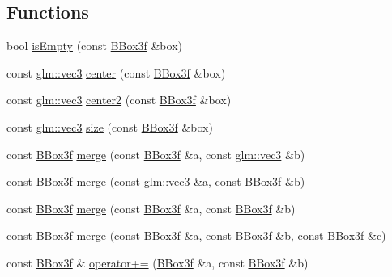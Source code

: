 \subsection*{Functions}
\begin{DoxyCompactItemize}
\item 
bool \hyperlink{namespaceglimac_af7b3a92359ef55ad38fb46b78d8f56f5}{is\+Empty} (const \hyperlink{structglimac_1_1_b_box3f}{B\+Box3f} \&box)
\item 
const \hyperlink{group__core__types_ga1c47e8b3386109bc992b6c48e91b0be7}{glm\+::vec3} \hyperlink{namespaceglimac_ae7ea0ad7ad60966328b8b2a198ad1dc5}{center} (const \hyperlink{structglimac_1_1_b_box3f}{B\+Box3f} \&box)
\item 
const \hyperlink{group__core__types_ga1c47e8b3386109bc992b6c48e91b0be7}{glm\+::vec3} \hyperlink{namespaceglimac_a1286d34984f2db1de4b7a161bcdcc79d}{center2} (const \hyperlink{structglimac_1_1_b_box3f}{B\+Box3f} \&box)
\item 
const \hyperlink{group__core__types_ga1c47e8b3386109bc992b6c48e91b0be7}{glm\+::vec3} \hyperlink{namespaceglimac_a66029611b8aa9645c13bb0d68c8f581e}{size} (const \hyperlink{structglimac_1_1_b_box3f}{B\+Box3f} \&box)
\item 
const \hyperlink{structglimac_1_1_b_box3f}{B\+Box3f} \hyperlink{namespaceglimac_a9f099e1c6ba9f33fe41cce02952266f5}{merge} (const \hyperlink{structglimac_1_1_b_box3f}{B\+Box3f} \&a, const \hyperlink{group__core__types_ga1c47e8b3386109bc992b6c48e91b0be7}{glm\+::vec3} \&b)
\item 
const \hyperlink{structglimac_1_1_b_box3f}{B\+Box3f} \hyperlink{namespaceglimac_af4d6083700d9822693de16c3e39c68c3}{merge} (const \hyperlink{group__core__types_ga1c47e8b3386109bc992b6c48e91b0be7}{glm\+::vec3} \&a, const \hyperlink{structglimac_1_1_b_box3f}{B\+Box3f} \&b)
\item 
const \hyperlink{structglimac_1_1_b_box3f}{B\+Box3f} \hyperlink{namespaceglimac_adf530cee77a4b3dadb118123627246b7}{merge} (const \hyperlink{structglimac_1_1_b_box3f}{B\+Box3f} \&a, const \hyperlink{structglimac_1_1_b_box3f}{B\+Box3f} \&b)
\item 
const \hyperlink{structglimac_1_1_b_box3f}{B\+Box3f} \hyperlink{namespaceglimac_a50870ad9d151e88df52a4e3734bb1643}{merge} (const \hyperlink{structglimac_1_1_b_box3f}{B\+Box3f} \&a, const \hyperlink{structglimac_1_1_b_box3f}{B\+Box3f} \&b, const \hyperlink{structglimac_1_1_b_box3f}{B\+Box3f} \&c)
\item 
const \hyperlink{structglimac_1_1_b_box3f}{B\+Box3f} \& \hyperlink{namespaceglimac_aee1b6179ee300f7f193cd70bd3f66c7f}{operator+=} (\hyperlink{structglimac_1_1_b_box3f}{B\+Box3f} \&a, const \hyperlink{structglimac_1_1_b_box3f}{B\+Box3f} \&b)

\end{DoxyCompactItemize}
